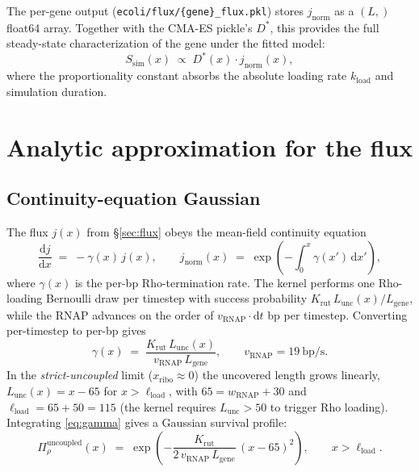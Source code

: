 \documentclass[11pt]{article}
\newcommand{\kload}{k_{\text{load}}}
\begin{document}
The per-gene output (\texttt{ecoli/flux/\{gene\}\_flux.pkl}) stores
$j_{\text{norm}}$ as a $(L,)$ float64 array. Together with the
CMA-ES pickle's $D^*$, this provides the full steady-state
characterization of the gene under the fitted model:
\begin{equation}
  S_{\text{sim}}(x) \;\propto\; D^*(x)\cdot j_{\text{norm}}(x),
\end{equation}
where the proportionality constant absorbs the absolute loading rate
$\kload$ and simulation duration.

\section{Analytic approximation for the flux}
\label{sec:flux_analytic}

\subsection{Continuity-equation Gaussian}

The flux $j(x)$ from \S\ref{sec:flux} obeys the mean-field continuity
equation
\begin{equation}
  \frac{\mathrm{d}j}{\mathrm{d}x} \;=\; -\gamma(x)\, j(x),
  \qquad
  j_{\text{norm}}(x) \;=\; \exp\!\left(-\int_0^x \gamma(x')\,\mathrm{d}x'\right),
\end{equation}
where $\gamma(x)$ is the per-bp Rho-termination rate. The kernel performs
one Rho-loading Bernoulli draw per timestep with success probability
$K_{\text{rut}}\, L_{\text{unc}}(x) / L_{\text{gene}}$, while the RNAP
advances on the order of $v_{\text{RNAP}} \cdot \mathrm{d}t$ bp per timestep.
Converting per-timestep to per-bp gives
\begin{equation}
  \gamma(x) \;=\; \frac{K_{\text{rut}}\, L_{\text{unc}}(x)}
                       {v_{\text{RNAP}}\, L_{\text{gene}}},
  \qquad v_{\text{RNAP}} = 19\ \text{bp/s}.
  \label{eq:gamma}
\end{equation}
In the \emph{strict-uncoupled} limit ($x_{\text{ribo}} \approx 0$) the
uncovered length grows linearly, $L_{\text{unc}}(x) = x - 65$ for
$x > \ell_{\text{load}}$, with $65 = w_{\text{RNAP}} + 30$ and
$\ell_{\text{load}} = 65 + 50 = 115$ (the kernel requires
$L_{\text{unc}} > 50$ to trigger Rho loading). Integrating
\eqref{eq:gamma} gives a Gaussian survival profile:
\begin{equation}
  \Pi_\rho^{\text{uncoupled}}(x) \;=\;
    \exp\!\left(-\frac{K_{\text{rut}}}{2\, v_{\text{RNAP}}\, L_{\text{gene}}}
                       \,(x - 65)^2\right),
  \qquad x > \ell_{\text{load}}.
  \label{eq:gauss-uncoupled}
\end{equation}
\end{document}
